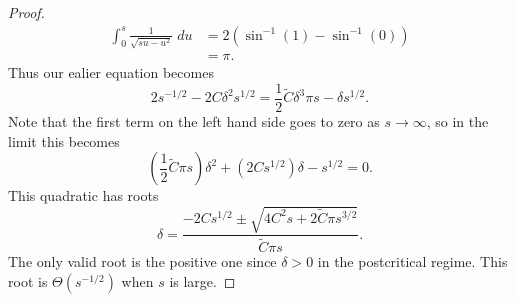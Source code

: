\documentclass[twoside,10pt]{article}
\begin{document}
\begin{proof}
	\begin{align*}
		\int_{0}^{s} \frac{1}{\sqrt{su-u^2} }\;du &= 2 \left( \sin^{-1}(1)-\sin^{-1}(0) \right) \\
							  &= \pi.
	\end{align*}
	Thus our ealier equation becomes
	\[
		2s^{-1/2} - 2C\delta^{2}s^{1/2} = \frac{1}{2} \tilde{C} \delta^{3} \pi s - \delta s^{1/2}.
	\]
        Note that the first term on the left hand side goes to zero as $s\to \infty$, so in the limit this becomes
	\[
		\left( \frac{1}{2} \tilde{C} \pi s \right)\delta^{2} + \left( 2C s^{1/2} \right)\delta - s^{1/2} =0.
	\]
	This quadratic has roots
	\[
	\delta = \frac{-2C s^{1/2} \pm \sqrt{4 C^2 s + 2 \tilde{C} \pi s^{3/2}} }{\tilde{C} \pi s}.
	\]
	The only valid root is the positive one since $\delta >0$ in the postcritical regime. This root is $\Theta(s^{-1/2})$ when $s$ is large.
\end{proof}
\end{document}
